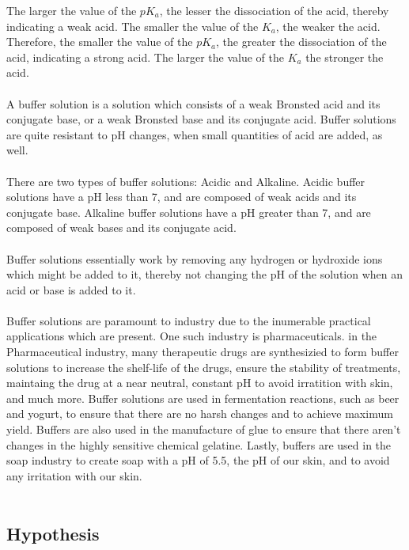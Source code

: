 \documentclass{article}
\begin{document}
\noindent
The larger the value of the $pK_a$, the lesser the dissociation of the acid, thereby indicating a weak acid. The smaller the value of the $K_a$, the weaker the acid. Therefore, the smaller the value of the $pK_a$, the greater the dissociation of the acid, indicating a strong acid. The larger the value of the $K_a$ the stronger the acid. \\\\
\noindent
A buffer solution is a solution which consists of a weak Bronsted acid and its conjugate base, or a weak Bronsted base and its conjugate acid. Buffer solutions are quite resistant to pH changes, when small quantities of acid are added, as well. \\\\
\noindent
There are two types of buffer solutions: Acidic and Alkaline. Acidic buffer solutions have a pH less than 7, and are composed of weak acids and its conjugate base. Alkaline buffer solutions have a pH greater than 7, and are composed of weak bases and its conjugate acid. \\\\
\noindent
Buffer solutions essentially work by removing any hydrogen or hydroxide ions which might be added to it, thereby not changing the pH of the solution when an acid or base is added to it. \\\\
\noindent
Buffer solutions are paramount to industry due to the inumerable practical applications which are present. One such industry is pharmaceuticals. in the Pharmaceutical industry, many therapeutic drugs are synthesizied to form buffer solutions to increase the shelf-life of the drugs, ensure the stability of treatments,  maintaing the drug at a near neutral, constant pH to avoid irratition with skin, and much more. 
Buffer solutions are used in fermentation reactions, such as beer and yogurt, to ensure that there are no harsh changes and to achieve maximum yield. Buffers are also used in the manufacture of glue to ensure that there aren't changes in the highly sensitive chemical gelatine. Lastly, buffers are used in the soap industry to create soap with a pH of 5.5, the pH of our skin, and to avoid any irritation with our skin. \\\\
\noindent

\subsection*{Hypothesis}%
\end{document}
